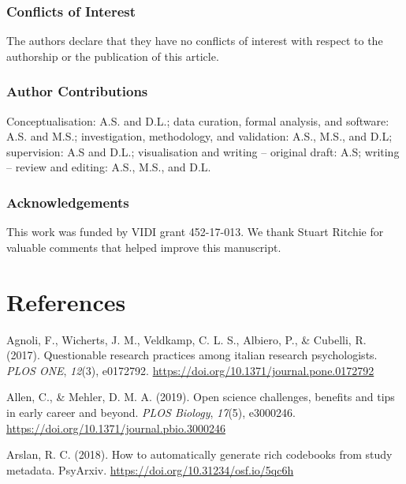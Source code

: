 \documentclass[british,,jou,floatsintext]{apa6}
\begin{document}
\hypertarget{conflicts-of-interest}{%
\subsubsection{Conflicts of Interest}\label{conflicts-of-interest}}

The authors declare that they have no conflicts of interest with respect to the authorship or the publication of this article.

\hypertarget{author-contributions}{%
\subsubsection{Author Contributions}\label{author-contributions}}

Conceptualisation: A.S. and D.L.; data curation, formal analysis, and software: A.S. and M.S.; investigation, methodology, and validation: A.S., M.S., and D.L; supervision: A.S and D.L.; visualisation and writing -- original draft: A.S; writing -- review and editing: A.S., M.S., and D.L.

\hypertarget{acknowledgements}{%
\subsubsection{Acknowledgements}\label{acknowledgements}}

This work was funded by VIDI grant 452-17-013. We thank Stuart Ritchie for valuable comments that helped improve this manuscript.

\hypertarget{references}{%
\section{References}\label{references}}

\setlength{\parindent}{-0.2in}
\setlength{\leftskip}{0.2in}

\hypertarget{refs}{}
\leavevmode\hypertarget{ref-Agnoli2017}{}%
Agnoli, F., Wicherts, J. M., Veldkamp, C. L. S., Albiero, P., \& Cubelli, R. (2017). Questionable research practices among italian research psychologists. \emph{PLOS ONE}, \emph{12}(3), e0172792. \url{https://doi.org/10.1371/journal.pone.0172792}

\leavevmode\hypertarget{ref-Allen2019}{}%
Allen, C., \& Mehler, D. M. A. (2019). Open science challenges, benefits and tips in early career and beyond. \emph{PLOS Biology}, \emph{17}(5), e3000246. \url{https://doi.org/10.1371/journal.pbio.3000246}

\leavevmode\hypertarget{ref-R-codebook}{}%
Arslan, R. C. (2018). How to automatically generate rich codebooks from study metadata. PsyArxiv. \url{https://doi.org/10.31234/osf.io/5qc6h}
\end{document}
